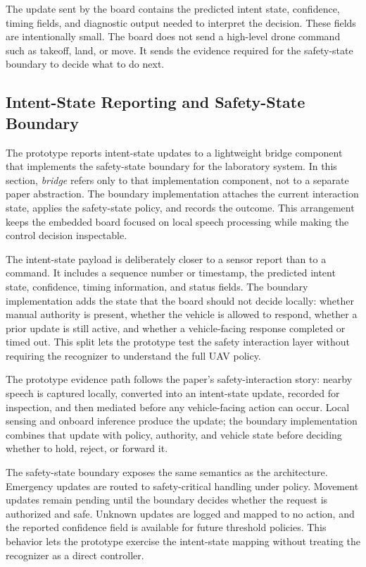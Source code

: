 The update sent by the board contains the predicted intent state, confidence, timing fields, and diagnostic output needed to interpret the decision. These fields are intentionally small. The board does not send a high-level drone command such as takeoff, land, or move. It sends the evidence required for the safety-state boundary to decide what to do next.

\subsection{Intent-State Reporting and Safety-State Boundary}

The prototype reports intent-state updates to a lightweight bridge component that implements the safety-state boundary for the laboratory system. In this section, \emph{bridge} refers only to that implementation component, not to a separate paper abstraction. The boundary implementation attaches the current interaction state, applies the safety-state policy, and records the outcome. This arrangement keeps the embedded board focused on local speech processing while making the control decision inspectable.

The intent-state payload is deliberately closer to a sensor report than to a command. It includes a sequence number or timestamp, the predicted intent state, confidence, timing information, and status fields. The boundary implementation adds the state that the board should not decide locally: whether manual authority is present, whether the vehicle is allowed to respond, whether a prior update is still active, and whether a vehicle-facing response completed or timed out. This split lets the prototype test the safety interaction layer without requiring the recognizer to understand the full UAV policy.

The prototype evidence path follows the paper's safety-interaction story: nearby speech is captured locally, converted into an intent-state update, recorded for inspection, and then mediated before any vehicle-facing action can occur. Local sensing and onboard inference produce the update; the boundary implementation combines that update with policy, authority, and vehicle state before deciding whether to hold, reject, or forward it.

The safety-state boundary exposes the same semantics as the architecture. Emergency updates are routed to safety-critical handling under policy. Movement updates remain pending until the boundary decides whether the request is authorized and safe. Unknown updates are logged and mapped to no action, and the reported confidence field is available for future threshold policies. This behavior lets the prototype exercise the intent-state mapping without treating the recognizer as a direct controller.

